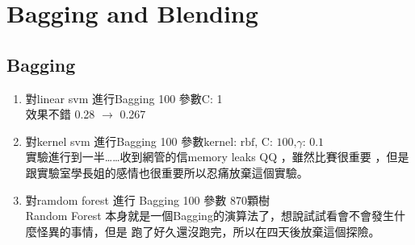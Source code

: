 \documentclass[12pt]{article}
\theoremstyle{definition}
\theoremstyle{remark}
\begin{document}
\section{Bagging and Blending}
\subsection{Bagging}
\begin{enumerate}
  \item 對linear svm 進行Bagging 100 參數C: 1 \\
    效果不錯 0.28 $ \to $ 0.267
  \item 對kernel svm 進行Bagging 100  參數$ \text{kernel: rbf, C: 100,} \gamma \text{: 0.1} $\\
    實驗進行到一半\dots\dots 收到網管的信memory leaks QQ ，雖然比賽很重要
    ，但是跟實驗室學長姐的感情也很重要所以忍痛放棄這個實驗。
  \item 對ramdom forest 進行 Bagging 100 參數 870顆樹\\
    Random Forest 本身就是一個Bagging的演算法了，想說試試看會不會發生什麼怪異的事情，但是
    跑了好久還沒跑完，所以在四天後放棄這個探險。
\end{enumerate}
\end{document}
